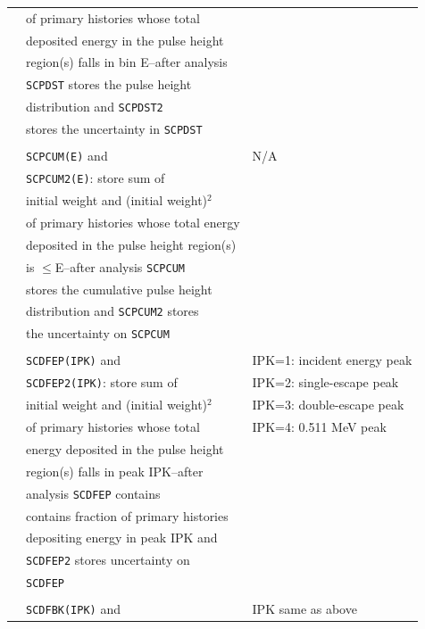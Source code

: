 \documentclass[12pt,twoside]{article}  %
\begin{document}
\begin{longtable}{lll}
          & of primary histories whose total&\\
          & deposited energy in the pulse height&\\
          & region(s) falls in bin E--after analysis&\\
          & {\tt SCPDST} stores the pulse height&\\
          & distribution and {\tt SCPDST2} &\\
          & stores the uncertainty in {\tt SCPDST}&\\
          &&\\
          & {\tt SCPCUM(E)} and & N/A\\
          & {\tt SCPCUM2(E)}: store sum of&\\
          & initial weight and (initial weight)$^2$ &\\
          & of primary histories whose total energy&\\
          & deposited in the pulse height region(s)&\\
          & is $\leq$E--after analysis {\tt SCPCUM}&\\
          & stores the cumulative pulse height&\\
          & distribution and {\tt SCPCUM2} stores&\\
          & the uncertainty on {\tt SCPCUM}&\\
          &&\\
          & {\tt SCDFEP(IPK)} and & IPK=1: incident energy peak\\
          & {\tt SCDFEP2(IPK)}: store sum of& IPK=2: single-escape peak\\
          & initial weight and (initial weight)$^2$ & IPK=3: double-escape peak\\
          & of primary histories whose total & IPK=4: 0.511 MeV peak\\
          & energy deposited in the pulse height&\\
          & region(s) falls in peak IPK--after &\\
          & analysis {\tt SCDFEP} contains &\\
          & contains fraction of primary histories&\\
          & depositing energy in peak IPK and &\\
          & {\tt SCDFEP2} stores uncertainty on&\\
          & {\tt SCDFEP}&\\
          &&\\
          & {\tt SCDFBK(IPK)} and & IPK same as above\\

\end{longtable}
\end{document}
